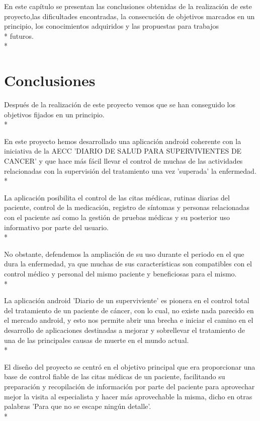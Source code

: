 \documentclass[../pfc.tex]{subfiles}
\begin{document}
	
	En este capítulo se presentan las conclusiones obtenidas de la realización de este proyecto,las dificultades encontradas, la consecución de objetivos marcados en un principio, los conocimientos adquiridos y las propuestas para trabajos\\* futuros.\\*
	
	\section{Conclusiones}
	
	Después de la realización de este proyecto vemos que se han conseguido los objetivos fijados en un principio.\\*
	
	En este proyecto hemos desarrollado una aplicación android coherente con la iniciativa de la AECC 'DIARIO DE SALUD PARA SUPERVIVIENTES DE CANCER' y que hace más fácil llevar el control de muchas de las actividades relacionadas con la supervisión del tratamiento una vez 'superada' la enfermedad.\\*
	
	La aplicación posibilita el control de las citas médicas, rutinas diarias del paciente, control de la medicación, registro de síntomas y personas relacionadas con el paciente así como la gestión de pruebas médicas y su posterior uso informativo por parte del usuario.\\*
	
	No obstante, defendemos la ampliación de su uso durante el periodo en el que dura la enfermedad, ya que muchas de sus características son compatibles con el control médico y personal del mismo paciente y beneficiosas para el mismo.\\*

	La aplicación android 'Diario de un superviviente' es pionera en el control total del tratamiento de un paciente de cáncer, con lo cual, no existe nada parecido en el mercado android, y esto nos permite abrir una brecha e iniciar el camino en el desarrollo de aplicaciones destinadas a mejorar y sobrellevar el tratamiento de una de las principales causas de muerte en el mundo actual.\\*
	
	El diseño del proyecto se centró en el objetivo principal que era proporcionar una base de control fiable de las citas médicas de un paciente, facilitando su preparación y recopilación de información por parte del paciente para aprovechar mejor la visita al especialista y hacer más aprovechable la misma, dicho en otras palabras 'Para que no se escape ningún detalle'.\\*
	
\end{document}
